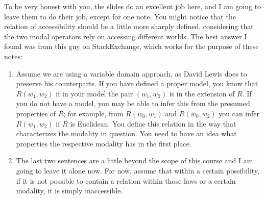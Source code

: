To be very honest with you, the slides do an excellent job here, and I am going to leave them to do their job, except for one note. You might notice that the relation of accessibility should be a little more sharply defined, considering that the two modal operators rely on accessing different worlds. The best answer I found was from this guy on StackExchange, which works for the purpose of these notes:
\begin{enumerate}
  \item Assume we are using a variable domain approach, as David Lewis does to preserve his counterparts. If you have defined a proper model, you know that $R(w_1, w_2)$ if in your model the pair $(w_1, w_2)$ is in the extension of $R$. If you do not have a model, you may be able to infer this from the presumed properties of $R$; for example, from $R(w_0, w_1)$ and $R(w_0, w_2)$ you can infer $R(w_1, w_2)$ if $R$ is Euclidean. You define this relation in the way that characterizes the modality in question. You need to have an idea what properties the respective modality has in the first place.
  \item The last two sentences are a little beyond the scope of this course and I am going to leave it alone now. For now, assume that within a certain possibility, if it is not possible to contain a relation within those laws or a certain modality, it is simply inaccessible.
\end{enumerate}


